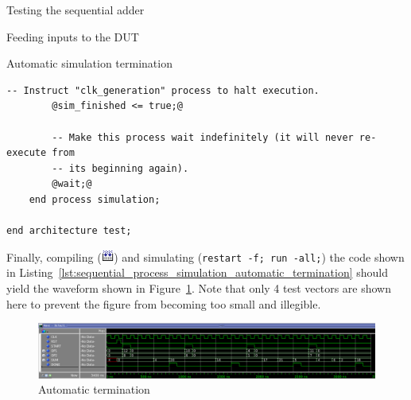 \documentclass[lab]{course}
\begin{document}
\begin{section}{Testing the sequential adder}
\begin{subsection}{Feeding inputs to the DUT}
\begin{subsubsection}{Automatic simulation termination}
\begin{lstlisting}[caption={Automatic simulation termination}, label={lst:sequential_process_simulation_automatic_termination}]
        -- Instruct "clk_generation" process to halt execution.
        @sim_finished <= true;@

        -- Make this process wait indefinitely (it will never re-execute from
        -- its beginning again).
        @wait;@
    end process simulation;

end architecture test;
            \end{lstlisting}

            Finally, compiling (\includegraphics[height=11pt]{figs/compile_all_icon.png}) and simulating (\verb+restart -f; run -all;+) the code shown in Listing~\ref{lst:sequential_process_simulation_automatic_termination} should yield the waveform shown in Figure~\ref{fig:waveform_sequential_process_automatically_terminates}. Note that only 4 test vectors are shown here to prevent the figure from becoming too small and illegible.

            \begin{figure}[!h]
                \begin{centering}
                    \includegraphics[width=\textwidth]{figs/waveform_sequential_process_automatic_termination.png}
                    \caption{Automatic termination}
                    \label{fig:waveform_sequential_process_automatically_terminates}
                \end{centering}
            \end{figure}

        \end{subsubsection}
    \end{subsection}

\end{section}

\end{document}

